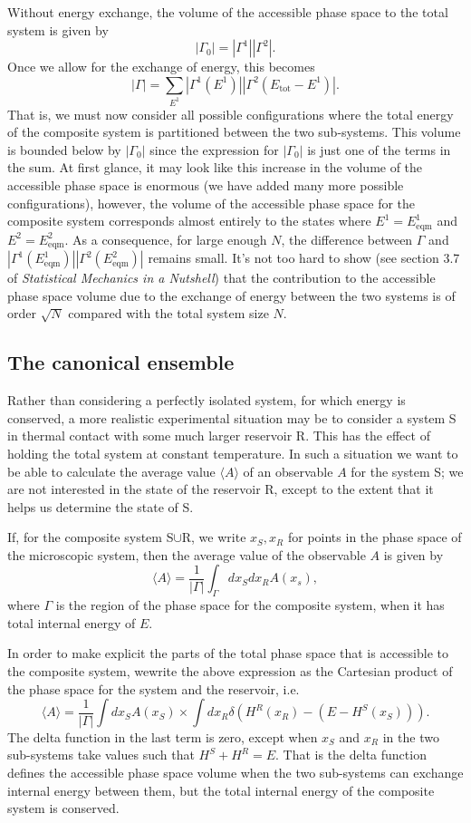 Without energy exchange, the volume of the accessible phase space to the total system is given by
$$
	|\Gamma_0| = |\Gamma^1||\Gamma^2|.
$$
Once we allow for the exchange of energy, this becomes
$$
	|\Gamma| = \sum_{E^1}|\Gamma^1(E^1)||\Gamma^2(E_\text{tot}-E^1)|.
$$
That is, we must now consider all possible configurations where the total energy of the composite system is partitioned between the two sub-systems. This volume is bounded below by $|\Gamma_0|$ since the expression for $|\Gamma_0|$ is just one of the terms in the sum. At first glance, it may look like this increase in the volume of the accessible phase space is enormous (we have added many more possible configurations), however, the volume of the accessible phase space for the composite system corresponds almost entirely to the states where $E^1=E^1_\text{eqm}$ and $E^2=E^2_\text{eqm}$. As a consequence, for large enough $N$, the difference between $\Gamma$ and $|\Gamma^1(E^1_\text{eqm})||\Gamma^2(E^2_\text{eqm})|$ remains small. It's not too hard to show (see section 3.7 of \emph{Statistical Mechanics in a Nutshell}) that the contribution to the accessible phase space volume due to the exchange of energy between the two systems is of order $\sqrt{N}$ compared with the total system size $N$.

\subsection{The canonical ensemble}

Rather than considering a perfectly isolated system, for which energy is conserved, a more realistic experimental situation may be to consider a system S in thermal contact with some much larger reservoir R. This has the effect of holding the total system at constant temperature. In such a situation we want to be able to calculate the average value $\langle A\rangle$ of an observable $A$ for the system S; we are not interested in the state of the reservoir R, except to the extent that it helps us determine the state of S.

If, for the composite system S$\cup$R, we write $x_S,x_R$ for points in the phase space of the microscopic system, then the average value of the observable $A$ is given by
$$
	\langle A\rangle = \frac{1}{|\Gamma|}\int_{\Gamma}dx_Sdx_RA(x_s),
$$
where $\Gamma$ is the region of the phase space for the composite system, when it has total internal energy of $E$.

In order to make explicit the parts of the total phase space that is accessible to the composite system, wewrite the above expression as the Cartesian product of the phase space for the system and the reservoir, i.e.
$$
	\langle A\rangle =\frac{1}{|\Gamma|}\int dx_SA(x_S)\times\int dx_R\delta(H^R(x_R)-(E-H^S(x_S))).
$$
The delta function in the last term is zero, except when $x_S$ and $x_R$ in the two sub-systems take values such that $H^S+H^R=E$. That is the delta function defines the accessible phase space volume when the two sub-systems can exchange internal energy between them, but the total internal energy of the composite system is conserved.

